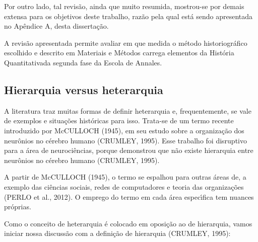 \documentclass[
12pt,		%
openright,	%
twoside,  %
a4paper,			%
chapter=TITLE,		%
english,			%
french,				%
spanish,			%
brazil				%
]{USPSC-classe/USPSC}
\begin{document}
Por outro lado, tal revis\~ao, ainda que muito resumida, mostrou-se por demais extensa para os objetivos deste trabalho, raz\~ao pela qual est\'a sendo apresentada no Ap\^endice A, desta disserta\c{c}\~ao.








A revis\~ao apresentada permite avaliar em que medida o m\'etodo historiogr\'afico escolhido e descrito em Materiais e M\'etodos carrega elementos da \textquotedbl Hist\'oria Quantitativa\textquotedbl  da segunda fase da Escola de Annales.








\subsection[Hierarquia versus heterarquia]{Hierarquia versus heterarquia}\label{Hierarquia versus heterarquia}
A literatura traz muitas formas de definir heterarquia e, frequentemente, se vale de exemplos e situa\c{c}\~oes hist\'oricas para isso. Trata-se de um termo  recente introduzido  por  McCULLOCH (1945), em seu estudo sobre a organiza\c{c}\~ao dos neur\^onios no c\'erebro humano  (CRUMLEY, 1995). Esse trabalho foi disruptivo para a \'area de neuroci\^encias, porque demonstrou que n\~ao existe hierarquia entre neur\^onios no c\'erebro humano  (CRUMLEY, 1995).








A partir de  McCULLOCH (1945), o termo se espalhou para outras \'areas de, a exemplo das ci\^encias sociais, redes de computadores e teoria das organiza\c{c}\~oes  (PERLO et al., 2012). O emprego do termo em cada \'area espec\'{\i}fica tem nuances pr\'oprias.








Como o conceito de heterarquia \'e colocado em oposi\c{c}\~ao ao de hierarquia, vamos iniciar nossa discuss\~ao com a defini\c{c}\~ao de hierarquia (CRUMLEY, 1995):









\noindent\begin{center}\mbox{\centering{}}\end{center}
\end{document}

